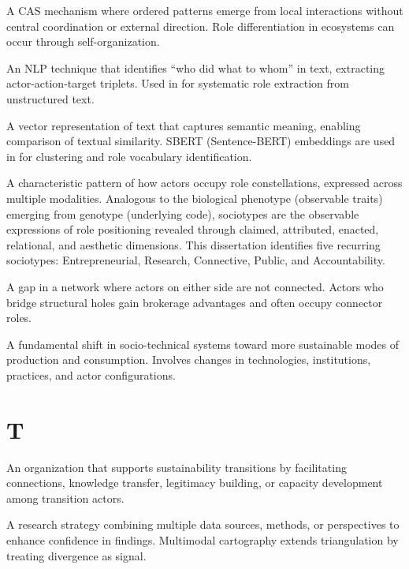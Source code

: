 \documentclass[../main.tex]{subfiles}
\begin{document}
\begin{description}[leftmargin=0.5cm, style=nextline]

\item[Self-Organization] A CAS mechanism where ordered patterns emerge from local interactions without central coordination or external direction. Role differentiation in ecosystems can occur through self-organization.

\item[Semantic Role Labeling (SRL)] An NLP technique that identifies ``who did what to whom'' in text, extracting actor-action-target triplets. Used in \RoleBox{} for systematic role extraction from unstructured text.

\item[Sentence Embedding] A vector representation of text that captures semantic meaning, enabling comparison of textual similarity. SBERT (Sentence-BERT) embeddings are used in \RoleBox{} for clustering and role vocabulary identification.

\item[Sociotype] A characteristic pattern of how actors occupy role constellations, expressed across multiple modalities. Analogous to the biological phenotype (observable traits) emerging from genotype (underlying code), sociotypes are the observable expressions of role positioning revealed through claimed, attributed, enacted, relational, and aesthetic dimensions. This dissertation identifies five recurring sociotypes: Entrepreneurial, Research, Connective, Public, and Accountability.

\item[Structural Hole] A gap in a network where actors on either side are not connected. Actors who bridge structural holes gain brokerage advantages and often occupy connector roles.

\item[Sustainability Transition] A fundamental shift in socio-technical systems toward more sustainable modes of production and consumption. Involves changes in technologies, institutions, practices, and actor configurations.

\end{description}

\section*{T}

\begin{description}[leftmargin=0.5cm, style=nextline]

\item[Transition Intermediary] An organization that supports sustainability transitions by facilitating connections, knowledge transfer, legitimacy building, or capacity development among transition actors.

\item[Triangulation] A research strategy combining multiple data sources, methods, or perspectives to enhance confidence in findings. Multimodal cartography extends triangulation by treating divergence as signal.

\end{description}
\end{document}
